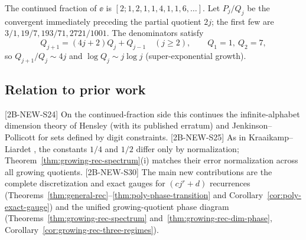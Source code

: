 The continued fraction of $\ee$ is $[2;1,2,1,1,4,1,1,6,\dots]$. Let $P_j/Q_j$
be the convergent immediately preceding the partial quotient $2j$; the first
few are $3/1,19/7,193/71,2721/1001$. The denominators satisfy
\begin{equation}\label{eq:rec}
Q_{j+1}=(4j+2)Q_j+Q_{j-1}\quad(j\ge2),\qquad Q_1=1,\ Q_2=7,
\end{equation}
so $Q_{j+1}/Q_j\sim 4j$ and $\log Q_j\sim j\log j$ (super-exponential growth).

\subsection{Relation to prior work}\label{sec:prior}

[2B-NEW-S24] On the continued-fraction side this continues the
infinite-alphabet dimension theory of Hensley \cite{Hensley1996}
(with its published erratum) and Jenkinson--Pollicott \cite{JP2018} for
sets defined by digit constraints.
[2B-NEW-S25] As in Kraaikamp--Liardet \cite{KL}, the constants $1/4$ and
$1/2$ differ only by normalization; Theorem~\ref{thm:growing-rec-spectrum}(i)
matches their error normalization across all growing quotients.
[2B-NEW-S30] The main new contributions are the complete discretization and
exact gauges for $(cj^r+d)$ recurrences
(Theorems~\ref{thm:general-rec}--\ref{thm:poly-phase-transition} and
Corollary~\ref{cor:poly-exact-gauge}) and the unified growing-quotient phase
diagram (Theorems~\ref{thm:growing-rec-spectrum}
and~\ref{thm:growing-rec-dim-phase},
Corollary~\ref{cor:growing-rec-three-regimes}).

